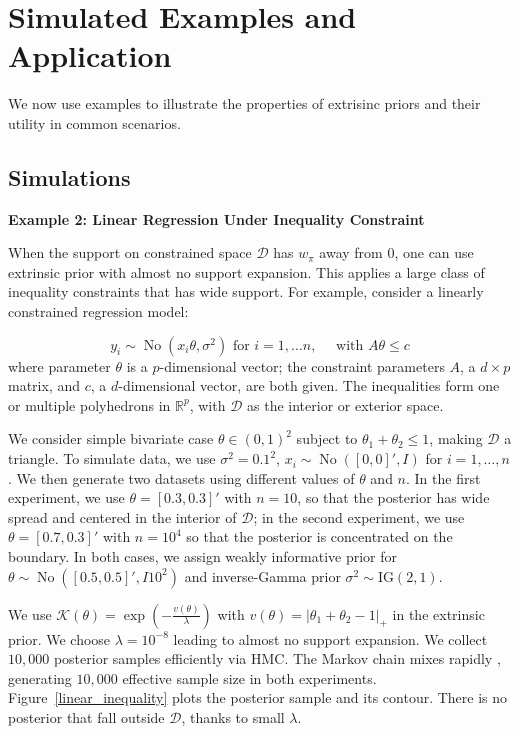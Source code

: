 \documentclass[10pt]{article}
\newcommand{\mc}[1]{\mathcal{#1}}
\DeclareMathOperator{\No}{No}
\DeclareMathOperator{\1}{\mathbbm{1}}
\begin{document}
\section{Simulated Examples and Application}

We now use examples to illustrate the properties of extrisinc priors and their utility in common scenarios.

\subsection{Simulations}

{\bf Example 2: Linear Regression Under Inequality Constraint}

When the support on constrained space $\mc D$ has $w_\pi$ away from $0$, one can use extrinsic prior with almost no support expansion. This applies a large class of inequality constraints that has wide support. For example, consider a linearly constrained regression model:

$$y_i \sim \No (x_i \theta, \sigma^2) \text{ for } i=1,\ldots n, \quad\text{ with } A\theta \le c$$
where parameter $\theta$ is a $p$-dimensional vector; the constraint parameters $A$, a $d\times p$ matrix, and $c$, a $d$-dimensional vector, are both given. The inequalities form one or multiple polyhedrons in $\mathbb R^p$, with $\mc D$ as the interior or exterior space.

We consider simple bivariate case $\theta \in (0,1)^2$ subject to $\theta_1+\theta_2\le 1$, making $\mc D$ a triangle. To simulate data, we use $\sigma^2=0.1^2$, $x_i\sim \No([0,0]',I)$ for $i=1,\ldots,n$. We then generate two datasets using different values of $\theta$ and $n$. In the first experiment, we use $\theta=[0.3,0.3]'$ with $n=10$, so that the posterior has wide spread and centered in the interior of $\mc D$; in the second experiment, we use $\theta=[0.7,0.3]'$ with $n=10^4$ so that the posterior is concentrated on the boundary. In both cases, we assign weakly informative prior for $\theta\sim \No([0.5, 0.5]',I10^2)$ and inverse-Gamma prior $\sigma^2\sim \text{IG}(2,1)$.

We use $\mc K(\theta)=\exp( - \frac{v(\theta)}{\lambda})$ with $v(\theta)=|\theta_1+\theta_2-1|_{+}$ in the extrinsic prior. We choose $\lambda=10^{-8}$ leading to almost no support expansion. We collect $10,000$ posterior samples efficiently via HMC. The Markov chain mixes rapidly , generating $10,000$ effective sample size in both experiments. Figure~\ref{linear_inequality} plots the posterior sample and its contour. There is no posterior that fall outside $\mc D$, thanks to small $\lambda$.
\end{document}
